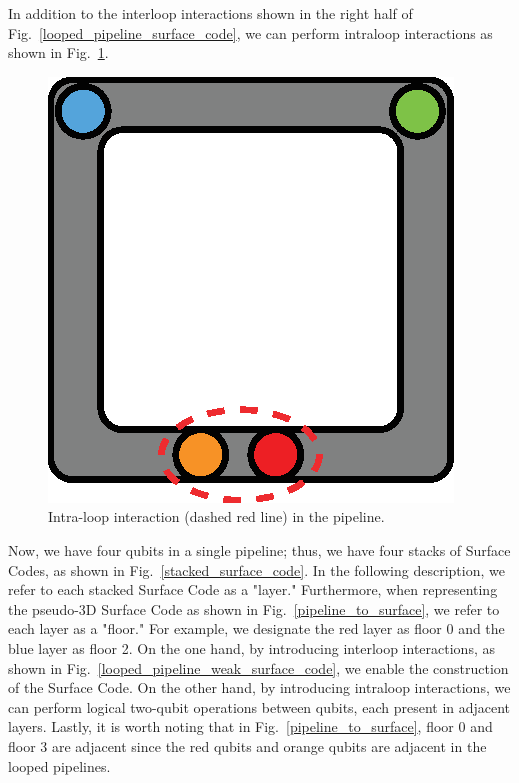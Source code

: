 \documentclass[a4paper,11pt]{ltjsarticle}
\begin{document}
{{        In addition to the interloop interactions shown in the right half of Fig.~\ref{looped_pipeline_surface_code}, we can perform intraloop interactions as shown in Fig.~\ref{intraloop_interaction}.

        \begin{figure}[h]
            \centering
            \includegraphics[scale=0.45]{figure/intraloop_interaction.eps}
            \vspace{0pt}\caption{Intra-loop interaction (dashed red line) in the pipeline.}
            \label{intraloop_interaction}
            \vspace{-10pt}
        \end{figure}

        Now, we have four qubits in a single pipeline; thus, we have four stacks of Surface Codes, as shown in Fig.~\ref{stacked_surface_code}. In the following description, we refer to each stacked Surface Code as a "layer." Furthermore, when representing the pseudo-3D Surface Code as shown in Fig.~\ref{pipeline_to_surface}, we refer to each layer as a "floor." For example, we designate the red layer as floor 0 and the blue layer as floor 2. On the one hand, by introducing interloop interactions, as shown in Fig.~\ref{looped_pipeline_weak_surface_code}, we enable the construction of the Surface Code. On the other hand, by introducing intraloop interactions, we can perform logical two-qubit operations between qubits, each present in adjacent layers. Lastly, it is worth noting that in Fig.~\ref{pipeline_to_surface}, floor 0 and floor 3 are adjacent since the red qubits and orange qubits are adjacent in the looped pipelines.

}}
\end{document}
